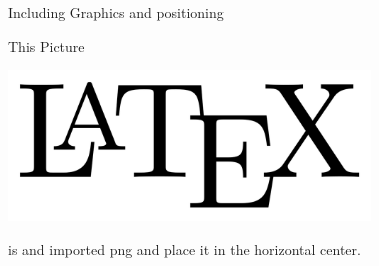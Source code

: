 \documentclass{article}
\begin{document}
Including Graphics and positioning

This Picture
\begin{center} %
    \includegraphics[height=4cm]{LaTeX_logo.svg.png}
\end{center}
is and imported png and place it in the horizontal center.
\end{document}
